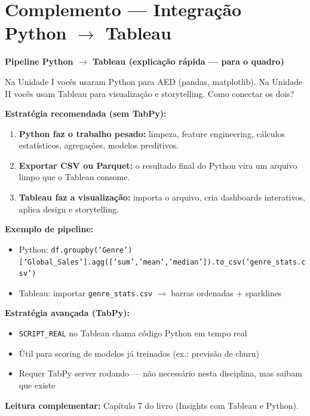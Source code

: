 \section{Complemento — Integração Python $\to$ Tableau}

\begin{BoardBox}
\textbf{Pipeline Python $\to$ Tableau (explicação rápida — para o quadro)}

Na Unidade I vocês usaram Python para AED (pandas, matplotlib).
Na Unidade II vocês usam Tableau para visualização e storytelling.
Como conectar os dois?

\textbf{Estratégia recomendada (sem TabPy):}
\begin{enumerate}
  \item \textbf{Python faz o trabalho pesado:} limpeza, feature engineering,
  cálculos estatísticos, agregações, modelos preditivos.
  \item \textbf{Exportar CSV ou Parquet:} o resultado final do Python
  vira um arquivo limpo que o Tableau consome.
  \item \textbf{Tableau faz a visualização:} importa o arquivo,
  cria dashboards interativos, aplica design e storytelling.
\end{enumerate}

\textbf{Exemplo de pipeline:}
\begin{itemize}
  \item Python: \texttt{df.groupby('Genre')['Global\_Sales'].agg(['sum','mean','median']).to\_csv('genre\_stats.csv')}
  \item Tableau: importar \texttt{genre\_stats.csv} $\to$ barras ordenadas + sparklines
\end{itemize}

\textbf{Estratégia avançada (TabPy):}
\begin{itemize}
  \item \texttt{SCRIPT\_REAL} no Tableau chama código Python em tempo real
  \item Útil para scoring de modelos já treinados (ex.: previsão de churn)
  \item Requer TabPy server rodando — não necessário nesta disciplina,
  mas saibam que existe
\end{itemize}

\textbf{Leitura complementar:} Capítulo 7 do livro (Insights com Tableau e Python).
\end{BoardBox}

